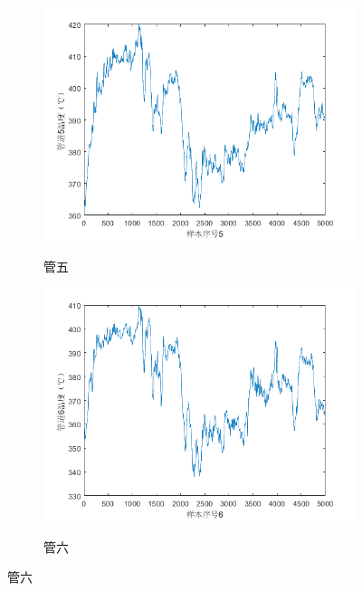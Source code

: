 \begin{figure}
\begin{subfigure}{0.32\textwidth}
                \includegraphics[width=\textwidth]{figures/p1_5.png}
                \label{p1_5}
                \caption{管五}
            \end{subfigure}
            \begin{subfigure}{0.32\textwidth}
                \includegraphics[width=\textwidth]{figures/p1_6.png}
                \label{p1_6}
                \caption{管六}
            \end{subfigure}
        \end{figure}

